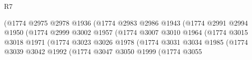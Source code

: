 \begin{lexlean}{R7}
\begin{coremodule}
                                              (@1774
                                                @2975
                                                @2978
                                                @1936
                                                (@1774
                                                  @2983
                                                  @2986
                                                  @1943
                                                  (@1774
                                                    @2991
                                                    @2994
                                                    @1950
                                                    (@1774
                                                      @2999
                                                      @3002
                                                      @1957
                                                      (@1774
                                                        @3007
                                                        @3010
                                                        @1964
                                                        (@1774
                                                          @3015
                                                          @3018
                                                          @1971
                                                          (@1774
                                                            @3023
                                                            @3026
                                                            @1978
                                                            (@1774
                                                              @3031
                                                              @3034
                                                              @1985
                                                              (@1774
                                                                @3039
                                                                @3042
                                                                @1992
                                                                (@1774
                                                                  @3047
                                                                  @3050
                                                                  @1999
                                                                  (@1774
                                                                    @3055

\end{coremodule}
\end{lexlean}
